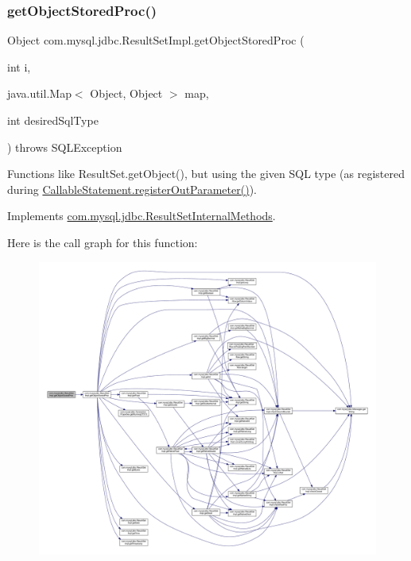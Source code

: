 \subsubsection{\texorpdfstring{get\+Object\+Stored\+Proc()}{getObjectStoredProc()}\hspace{0.1cm}{\footnotesize\ttfamily [2/4]}}
{\footnotesize\ttfamily Object com.\+mysql.\+jdbc.\+Result\+Set\+Impl.\+get\+Object\+Stored\+Proc (\begin{DoxyParamCaption}\item[{int}]{i,  }\item[{java.\+util.\+Map$<$ Object, Object $>$}]{map,  }\item[{int}]{desired\+Sql\+Type }\end{DoxyParamCaption}) throws S\+Q\+L\+Exception}

Functions like Result\+Set.\+get\+Object(), but using the given S\+QL type (as registered during \mbox{\hyperlink{classcom_1_1mysql_1_1jdbc_1_1_callable_statement_a5158af0506cf90040062b2049550f59b}{Callable\+Statement.\+register\+Out\+Parameter()}}). 

Implements \mbox{\hyperlink{interfacecom_1_1mysql_1_1jdbc_1_1_result_set_internal_methods_accf48b92de260b6e92cf8bdd0ec49a29}{com.\+mysql.\+jdbc.\+Result\+Set\+Internal\+Methods}}.

Here is the call graph for this function\+:
\nopagebreak
\begin{figure}[H]
\begin{center}
\leavevmode
\includegraphics[width=350pt]{classcom_1_1mysql_1_1jdbc_1_1_result_set_impl_a30be3e2e7e3998035613e01d5674aa71_cgraph}
\end{center}
\end{figure}
\mbox{\label{classcom_1_1mysql_1_1jdbc_1_1_result_set_impl_a3a52fc30cfaf7a73fca13e48bbc8a5d0}} 
